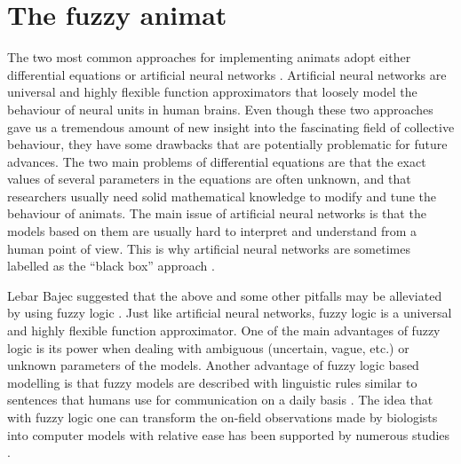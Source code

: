 \section{The fuzzy animat}

The two most common approaches for implementing animats adopt either differential equations \cite{couzin2002collective,hildenbrandt2010selforganized,reynolds1987flocks,vicsek2012collective} or artificial neural networks \cite{kunz2006prey,witkowski2016emergence,zaera1996not}. Artificial neural networks \cite{mcculloch1943logical} are universal and highly flexible function approximators that loosely model the behaviour of neural units in human brains. Even though these two approaches gave us a tremendous amount of new insight into the fascinating field of collective behaviour, they have some drawbacks that are potentially problematic for future advances. The two main problems of differential equations are that the exact values of several parameters in the equations are often unknown, and that researchers usually need solid mathematical knowledge to modify and tune the behaviour of animats. The main issue of artificial neural networks is that the models based on them are usually hard to interpret and understand from a human point of view. This is why artificial neural networks are sometimes labelled as the ``black box'' approach \cite{paruelo1997prediction,lek1999artificial,ozesmi1999artificial}. 

Lebar Bajec\etal \cite{lebarbajec2005fuzzy,lebarbajec2005simulating} suggested that the above and some other pitfalls may be alleviated by using fuzzy logic \cite{zadeh1965fuzzy}. Just like artificial neural networks, fuzzy logic is a universal and highly flexible function approximator. One of the main advantages of fuzzy logic is its power when dealing with ambiguous (uncertain, vague, etc.) or unknown parameters of the models. Another advantage of fuzzy logic based modelling is that fuzzy models are described with linguistic rules similar to sentences that humans use for communication on a daily basis \cite{kosko1994fuzzy,lebarbajec2005fuzzy,lebarbajec2005simulating,mamdani1974application,mamdani1975experiment,mendel2001uncertain,zadeh1965fuzzy}. The idea that with fuzzy logic one can transform the on-field observations made by biologists into computer models with relative ease has been supported by numerous studies \cite{dasilva2008predator,demsar2013family,demsar2014simulated,demsar2016balanced,demsar2017evolution,gras2009individualbasedevolving,lebarbajec2005fuzzy,lebarbajec2005simulating,mashayekhi2015individualbased,tron2004mathematical}.

